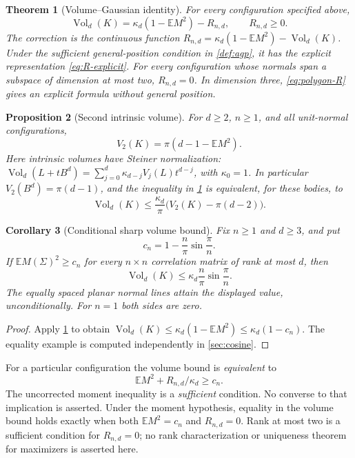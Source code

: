 \documentclass[10pt,reqno]{amsart}
\newtheorem{theorem}{Theorem}[section]
\newtheorem{proposition}[theorem]{Proposition}
\newtheorem{corollary}[theorem]{Corollary}
\theoremstyle{definition}
\theoremstyle{remark}
\newcommand{\E}{\mathbb E}
\newcommand{\Vol}{\operatorname{Vol}}
\begin{document}
\begin{theorem}[Volume--Gaussian identity]\label{thm:main}
For every configuration specified above,
\begin{equation}\label{eq:main-identity}
\boxed{\Vol_d(K)=\kappa_d(1-\E M^2)-R_{n,d},\qquad R_{n,d}\ge0.}
\end{equation}
The correction is the continuous function
$R_{n,d}=\kappa_d(1-\E M^2)-\Vol_d(K)$.
Under the sufficient general-position condition in \cref{def:agp}, it has the explicit representation \eqref{eq:R-explicit}. For every configuration whose normals span a subspace of dimension at most two, $R_{n,d}=0$. In dimension three, \eqref{eq:polygon-R} gives an explicit formula without general position.
\end{theorem}

\begin{proposition}[Second intrinsic volume]\label{prop:V2}
For $d\ge2$, $n\ge1$, and all unit-normal configurations,
\begin{equation}\label{eq:V2-gaussian}
\boxed{V_2(K)=\pi(d-1-\E M^2).}
\end{equation}
Here intrinsic volumes have Steiner normalization:
$\Vol_d(L+tB^d)=\sum_{j=0}^d\kappa_{d-j}V_j(L)t^{d-j}$, with $\kappa_0=1$.
In particular $V_2(B^d)=\pi(d-1)$, and the inequality in \cref{thm:main} is equivalent, for these bodies, to
\begin{equation}\label{eq:Vd-V2}
\Vol_d(K)\le\frac{\kappa_d}{\pi}\bigl(V_2(K)-\pi(d-2)\bigr).
\end{equation}
\end{proposition}

\begin{corollary}[Conditional sharp volume bound]\label{cor:kunisky}
Fix $n\ge1$ and $d\ge3$, and put
\begin{equation}\label{eq:cn}
c_n=1-\frac n\pi\sin\frac\pi n.
\end{equation}
If $\E M(\Sigma)^2\ge c_n$ for every $n\times n$ correlation matrix of rank at most $d$, then
\begin{equation}\label{eq:sharp-volume-bound}
\boxed{\Vol_d(K)\le\kappa_d\frac n\pi\sin\frac\pi n.}
\end{equation}
The equally spaced planar normal lines attain the displayed value, unconditionally. For $n=1$ both sides are zero.
\end{corollary}
\begin{proof}
Apply \cref{thm:main} to obtain
$\Vol_d(K)\le\kappa_d(1-\E M^2)\le\kappa_d(1-c_n)$.
The equality example is computed independently in \cref{sec:cosine}.
\end{proof}
For a particular configuration the volume bound is \emph{equivalent} to
\begin{equation}\label{eq:corrected-gaussian}
\E M^2+R_{n,d}/\kappa_d\ge c_n.
\end{equation}
The uncorrected moment inequality is a \emph{sufficient} condition. No converse to that implication is asserted. Under the moment hypothesis, equality in the volume bound holds exactly when both $\E M^2=c_n$ and $R_{n,d}=0$. Rank at most two is a sufficient condition for $R_{n,d}=0$; no rank characterization or uniqueness theorem for maximizers is asserted here.
\end{document}
